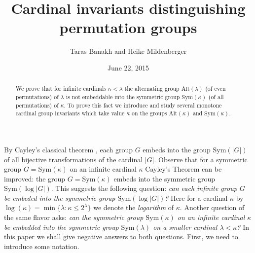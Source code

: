 \documentclass[11pt, twoside]{amsart}
\theoremstyle{definition}
\begin{document}
\title{Cardinal invariants distinguishing permutation groups}
\author{Taras Banakh and Heike Mildenberger}
\address{Taras Banakh: Jan Kochanowski University in Kielce (Poland) and Ivan Franko National University of Lviv (Ukraine)}

\address{Heike Mildenberger:  Abteilung f\"ur Mathematische Logik,
Mathematisches Institut, Universit\"at Freiburg, Eckerstr.~1,
 79104 Freiburg im Breisgau, Germany}

\begin{abstract} We prove that for infinite cardinals $\kappa<\lambda$ the alternating group ${\mathrm{Alt}}(\lambda)$ (of even permutations) of $\lambda$ is not embeddable into the symmetric group ${\mathrm{Sym}}(\kappa)$ (of all permutations) of $\kappa$. To prove this fact we introduce and study several monotone cardinal group invariants which take value $\kappa$ on the groups  ${\mathrm{Alt}}(\kappa)$ and ${\mathrm{Sym}}(\kappa)$.
\end{abstract}


\date{June 22, 2015}


\maketitle

By Cayley's classical theorem \cite[1.6.8]{Rob}, each group $G$ embeds into the group ${\mathrm{Sym}}(|G|)$ of all bijective transformations of the cardinal $|G|$. Observe that for a symmetric group $G={\mathrm{Sym}}(\kappa)$ on an infinite cardinal $\kappa$ Cayley's Theorem can be improved: the group $G={\mathrm{Sym}}(\kappa)$ embeds into the symmetric group ${\mathrm{Sym}}(\log|G|)$. This suggests the following question: {\em can each infinite group $G$ be embeded into the symmetric group ${\mathrm{Sym}}(\log|G|)$?} Here for a cardinal $\kappa$ by $\log(\kappa)=\min\{\lambda:\kappa\le 2^\lambda\}$ we denote the {\em logarithm} of $\kappa$.
Another question of the same flavor asks: {\em can the symmetric group ${\mathrm{Sym}}(\kappa)$ on an infinite cardinal $\kappa$ be embedded into the symmetric group ${\mathrm{Sym}}(\lambda)$ on a smaller cardinal $\lambda<\kappa$?} In this paper we shall give negative answers to both questions.
First, we need to introduce some notation.
\end{document}
